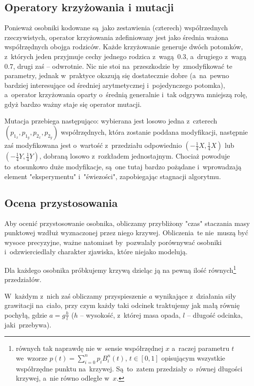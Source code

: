 \documentclass{classrep}
\begin{document}
\subsection{Operatory krzyżowania i mutacji}
Ponieważ osobniki kodowane są~jako zestawienia (czterech) współrzednych rzeczywistych, 
operator krzyżowania zdefiniowany jest jako średnia ważona współrzędnych obojga rodziców. 
Każde krzyżowanie generuje dwóch potomków, z~których jeden przyjmuje cechy jednego rodzica
z~wagą~0.3, a~drugiego z~wagą 0.7, drugi zaś -- odwrotnie. Nic nie stoi na~przeszkodzie 
by~zmodyfikować te parametry, jednak w~praktyce okazują się dostatecznie dobre (a~na~pewno
bardziej interesujące od średniej arytmetycznej i~pojedynczego potomka), a~operator krzyżowania
oparty o~średnią generalnie i~tak odgrywa mniejszą rolę, gdyż bardzo ważny staje się operator
mutacji.

Mutacja przebiega następująco: wybierana jest losowo jedna z~czterech $(p_{1_x}, p_{1_y}, p_{2_x}, p_{2_y})$
współrzędnych, która zostanie poddana modyfikacji, następnie zaś modyfikowana jest o~wartość
z~przedziału odpowiednio $(-\frac{1}{4}{X}, \frac{1}{4}{X})$ lub $(-\frac{1}{4}{Y}, \frac{1}{4}{Y})$,
dobraną losowo z~rozkładem jednostajnym. Chociaż powoduje to~stosunkowo duże modyfikacje, są~one tutaj
bardzo pożądane i~wprowadzają element "eksperymentu" i~"świezości", zapobiegając stagnacji algorytmu.


\subsection{Ocena przystosowania}

Aby ocenić przystosowanie osobnika, obliczamy przybliżony "czas" staczania masy punktowej 
wzdłuż wyznaczonej przez niego krzywej. Obliczenia~te nie~muszą być wysoce precyzyjne, ważne
natomiast by~pozwalały porównywać osobniki i~odzwierciedlały charakter zjawiska, które niejako
modelują.

Dla każdego osobnika próbkujemy krzywą dzieląc ją na pewną ilość równych\footnote{równych tak naprawdę
nie w~sensie współrzędnej $x$ a~raczej parametru $t$ we~wzorze $p(t)=\sum_{i=0}^{n}{p_i B_i^n(t)}$, 
$t\in[0,1]$ opisującym wszystkie współrzędne punktu na~krzywej. Są~to~zatem przedziały o~równej 
długości krzywej, a~nie równo odległe w~$x$.} przedziałów. 

W~każdym z~nich zaś obliczamy przyspieszenie $a$ wynikające z~działania siły grawitacji na~ciało, 
przy czym każdy taki odcinek traktujemy jak małą równię pochyłą, gdzie $a=g\frac{h}{l}$ 
($h$ -- wysokość, z~której masa opada, $l$ -- długość odcinka, jaki~przebywa).
\end{document}
